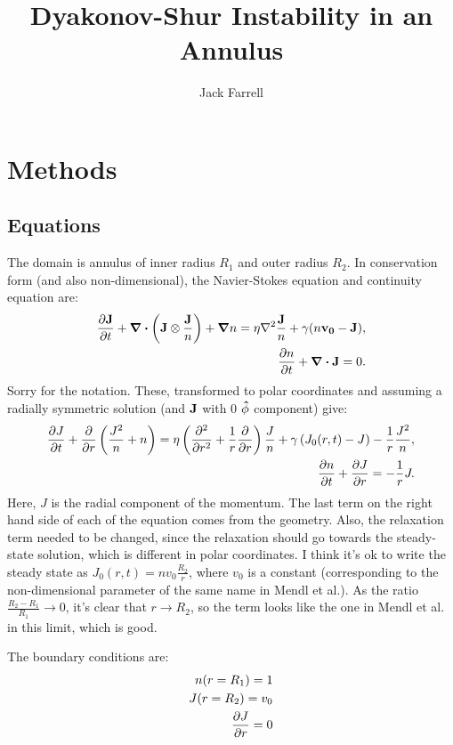 \documentclass[12pt]{article}
\title{Dyakonov-Shur Instability in an Annulus}
\author{Jack Farrell}
\begin{document}
	\maketitle
	\section{Methods}
	\subsection{Equations}
	The domain is annulus of inner radius $R_1$ and outer radius $R_2$.  In conservation form (and also non-dimensional), the Navier-Stokes equation and continuity equation are:
	\begin{equation}
	\centering
		\begin{split}
			\pdv{\vb{J}}{t} + \div{\left( \vb{J} \otimes \frac{\vb{J}}{n}\right)} +\grad{n} = \eta \laplacian{\frac{\vb{J}}{n}} + \gamma (n\vb{v_0} - \vb{J}), \\
			\pdv{n}{t} + \div{\vb{J}} = 0. \\
		\end{split}
	\end{equation}
	Sorry for the notation. These, transformed to polar coordinates and assuming a radially symmetric solution (and $\vb{J}$ with $0$ $\vu{\phi}$ component) give:
	\begin{equation}
	\begin{split}
			\pdv{J}{t} + \pdv{r}\left(\frac{J^2}{n}+n\right) = \eta \left(\pdv[2]{r} + \frac{1}{r}\pdv{r}\right)\frac{J}{n} + \gamma\left(J_0(r, t) - J\right) - \frac{1}{r}\frac{J^2}{n}, \\
			\pdv{n}{t} + \pdv{J}{r} = -\frac{1}{r}J. \\
	\end{split}
	\end{equation}
	Here, $J$ is the radial component of the momentum.
	The last term on the right hand side of each of the equation comes from the geometry.  Also, the relaxation term needed to be changed, since the relaxation should go towards the steady-state solution, which is different in polar coordinates.  I think it's ok to write the steady state as $J_0(r, t) = nv_0\frac{R_2}{r}$, where $v_0$ is a constant (corresponding to the non-dimensional parameter of the same name in Mendl et al.).  As the ratio $\frac{R_2 - R_1}{R_1} \rightarrow 0$, it's clear that $r \rightarrow R_2$, so the term looks like the one in Mendl et al. in this limit, which is good.
	
	The boundary conditions are:
	\begin{equation}
	\begin{split}
		n(r = R_1) = 1 \\
		J(r = R_2) = v_0 \\
		\pdv{J}{r} (R = R_1) = 0 \\
	\end{split}
	\end{equation}
	
\end{document}
